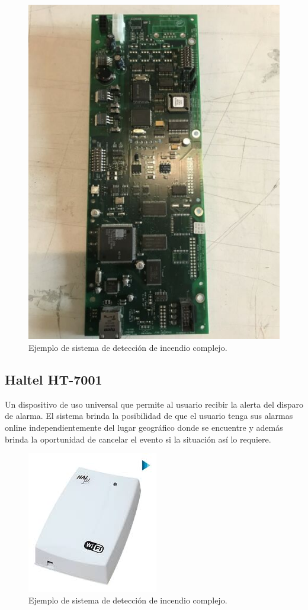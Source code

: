 \begin{figure}[h]
	\centering
	\includegraphics[scale=.4]{./Figures/Capitulo1/FIG_D1.jpg}
	\caption{Ejemplo de sistema de detección de incendio complejo.}
	\label{fig:figura_d1}
\end{figure}

\subsection{Haltel HT-7001}

Un dispositivo de uso universal que permite al usuario recibir la alerta del disparo de alarma. El sistema brinda la posibilidad de que el usuario tenga sus alarmas online independientemente del lugar geográfico donde se encuentre y además brinda la oportunidad de cancelar el evento si la situación así lo requiere. 

\begin{figure}[h]
	\centering
	\includegraphics[scale=.4]{./Figures/Capitulo1/FIG_E1.jpeg}
	\caption{Ejemplo de sistema de detección de incendio complejo.}
	\label{fig:figura_e1}
\end{figure}	
	
